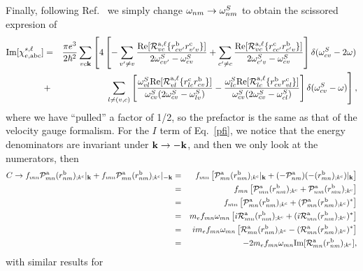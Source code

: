 \documentclass[floatfix,prb,aps,superscriptaddress,11pt,preprint]{revtex4}
\begin{document}
Finally, following Ref.~ we simply change
$\omega_{nm}\to\omega_{nm}^S$ to obtain the scissored expresion of
\begin{eqnarray}\label{imchies}
\mathrm{Im}[\chi_{e,\mathrm{a}\mathrm{b}\mathrm{c}}^{s,\ell}]
&=&
\frac{\pi e^3}{2\hbar^2} 
\sum_{vc\mathbf{k}}
\left[
4
\left[
-\sum_{v'\ne v}
\frac{\mathrm{Re}[{\cal R}^{\mathrm{a},\ell}_{vc}\{r^{\mathrm{b}}_{cv'}r^{\mathrm{c}}_{v'v}\}]
}{2\omega^S_{cv'}-\omega^S_{cv}}
+
\sum_{c'\ne c}
\frac{\mathrm{Re}[{\cal R}^{\mathrm{a},\ell}_{vc}\{r^{\mathrm{c}}_{cc'}r^{\mathrm{b}}_{c'v}\}]}
{2\omega^S_{c'v}-\omega^S_{cv}}
\right]
\delta(\omega^S_{cv}-2\omega)
\right.
\nonumber\\
&+&
\left.
\sum_{l\neq(v,c)}
\left[
\frac{\omega^S_{vl}\mathrm{Re}[{\cal R}^{\mathrm{a},\ell}_{vl}\{r^{\mathrm{c}}_{lc}r^{\mathrm{b}}_{cv}\}]}
{\omega^S_{cv}(2\omega^S_{cv}-\omega^S_{lv})}
-
\frac{\omega^S_{lc}\mathrm{Re}[{\cal R}^{\mathrm{a},\ell}_{lc}\{r^{\mathrm{b}}_{cv}r^{\mathrm{c}}_{vl}\}]}
{\omega^S_{cv}(2\omega^S_{cv}-\omega^S_{cl})}
\right]
\delta(\omega^S_{cv}-\omega)
\right]
,
\end{eqnarray}  
where we have ``pulled'' a factor of 1/2, so the prefactor is the same
as that of the velocity gauge formalism.\cite{cabellosPRB09} 
For the $I$ term of Eq.~\eqref{pfi}, we notice that the energy
denominators are invariant under $\mathbf{k}\to -\mathbf{k}$, and then we only
look at the numerators, then
\begin{eqnarray}\label{ct}
C\to f_{mn}{\cal P}^{\mathrm{a}}_{mn}(r^{\mathrm{b}}_{nm})_{;k^{\mathrm{c}}}|_{\mathbf{k}}
+
f_{mn}{\cal P}^{\mathrm{a}}_{mn}(r^{\mathrm{b}}_{nm})_{;k^{\mathrm{c}}}|_{-\mathbf{k}}
&=&
f_{mn}\left[{\cal P}^{\mathrm{a}}_{mn}(r^{\mathrm{b}}_{nm})_{;k^{\mathrm{c}}}|_{\mathbf{k}}
+
(-{\cal P}^{\mathrm{a}}_{nm})(-(r^{\mathrm{b}}_{mn})_{;k^{\mathrm{c}}})|_{\mathbf{k}}
\right]
\nonumber\\
&=&
f_{mn}\left[{\cal P}^{\mathrm{a}}_{mn}(r^{\mathrm{b}}_{nm})_{;k^{\mathrm{c}}}
+
{\cal P}^{\mathrm{a}}_{nm}(r^{\mathrm{b}}_{mn})_{;k^{\mathrm{c}}}
\right]
\nonumber\\
&=&
f_{mn}\left[{\cal P}^{\mathrm{a}}_{mn}(r^{\mathrm{b}}_{nm})_{;k^{\mathrm{c}}}
+
({\cal P}^{\mathrm{a}}_{mn}(r^{\mathrm{b}}_{nm})_{;k^{\mathrm{c}}})^*
\right]
\nonumber\\
&=& 
m_ef_{mn}\omega_{mn}\left[i{\cal R}^{\mathrm{a}}_{mn}(r^{\mathrm{b}}_{nm})_{;k^{\mathrm{c}}}
+
(i{\cal R}^{\mathrm{a}}_{mn}(r^{\mathrm{b}}_{nm})_{;k^{\mathrm{c}}})^*
\right]
\nonumber\\
&=& 
im_ef_{mn}\omega_{mn}\left[{\cal R}^{\mathrm{a}}_{mn}(r^{\mathrm{b}}_{nm})_{;k^{\mathrm{c}}}
-
({\cal R}^{\mathrm{a}}_{mn}(r^{\mathrm{b}}_{nm})_{;k^{\mathrm{c}}})^*
\right]
\nonumber\\
&=& 
-2m_ef_{mn}\omega_{mn}\mathrm{Im}[{\cal R}^{\mathrm{a}}_{mn}(r^{\mathrm{b}}_{nm})_{;k^{\mathrm{c}}}]
,
\end{eqnarray}
with similar results for 
\end{document}
